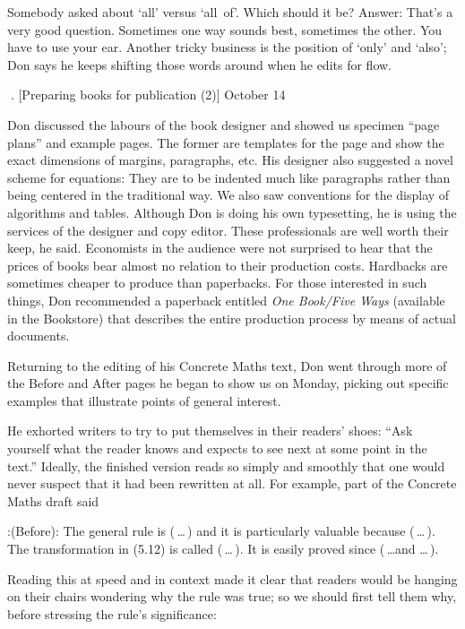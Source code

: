 Somebody asked about `all' versus `all~of'. Which should it be? Answer:
That's a very good question. Sometimes one way sounds best, sometimes
the other. You have to use your ear. Another tricky business is the position
of `only' and `also'; Don says he keeps shifting those words around when he edits
for flow.

. [Preparing books for publication (2)] \pmr October 14

Don discussed the labours of the book designer and showed us specimen
``page plans'' and example pages.  The former are templates for the page
and show the exact dimensions of margins, paragraphs, etc. His designer
also suggested
a novel scheme for equations: They are to be indented
much like paragraphs rather than being centered in the traditional
way.  We also saw conventions for the display of algorithms and
tables.  Although Don is doing his own typesetting, he is using the
services of the designer and copy editor. These professionals are well
worth their keep, he said.  Economists in the audience were not
surprised to hear that the prices of books bear almost no relation to
their production costs. Hardbacks are sometimes cheaper to produce
than paperbacks. For those interested in such things, Don recommended
a paperback entitled {\sl One Book\thinspace/\thinspace Five Ways\/}
(available in the Bookstore)
that describes the entire production process by means of actual documents.

Returning to the editing of his Concrete Maths text, Don went through
more of the Before and After pages he began to show us on
Monday, picking out specific examples that illustrate points of general
interest.

He exhorted 
writers to try to put themselves in their readers' shoes: ``Ask yourself what
the reader knows and expects to see next at some point in the text.''
Ideally, the finished version reads so simply and smoothly that one
would never suspect that it had been rewritten at all. 
For example, part of the Concrete Maths draft said

\display 80pt:(Before):
The general rule is ($\,$\dots$\,$) and it is particularly valuable because
($\,$\dots$\,$). The transformation in (5.12) is called ($\,$\dots$\,$). It is
easily proved since ($\,$\dots and \dots$\,$).

Reading this at speed and in context made it clear that readers would
be hanging on their chairs wondering why the rule was true; so we
should first tell them why, before stressing the rule's significance:

